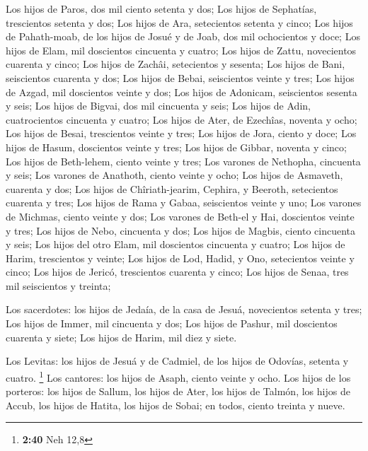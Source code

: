  Los hijos de Paros, dos mil ciento setenta y dos;
 Los hijos de Sephatías, trescientos setenta y dos;
 Los hijos de Ara, setecientos setenta y cinco;
 Los hijos de Pahath-moab, de los hijos de Josué y de
Joab, dos mil ochocientos y doce;  Los hijos de Elam, mil
doscientos cincuenta y cuatro;  Los hijos de Zattu,
novecientos cuarenta y cinco;  Los hijos de Zachâi,
setecientos y sesenta;  Los hijos de Bani, seiscientos
cuarenta y dos;  Los hijos de Bebai, seiscientos veinte y
tres;  Los hijos de Azgad, mil doscientos veinte y dos;
 Los hijos de Adonicam, seiscientos sesenta y seis;
 Los hijos de Bigvai, dos mil cincuenta y seis;
 Los hijos de Adin, cuatrocientos cincuenta y cuatro;
 Los hijos de Ater, de Ezechîas, noventa y ocho;
 Los hijos de Besai, trescientos veinte y tres;
 Los hijos de Jora, ciento y doce;  Los
hijos de Hasum, doscientos veinte y tres;  Los hijos de
Gibbar, noventa y cinco;  Los hijos de Beth-lehem, ciento
veinte y tres;  Los varones de Nethopha, cincuenta y
seis;  Los varones de Anathoth, ciento veinte y ocho;
 Los hijos de Asmaveth, cuarenta y dos; 
Los hijos de Chîriath-jearim, Cephira, y Beeroth, setecientos cuarenta y
tres;  Los hijos de Rama y Gabaa, seiscientos veinte y
uno;  Los varones de Michmas, ciento veinte y dos;
 Los varones de Beth-el y Hai, doscientos veinte y tres;
 Los hijos de Nebo, cincuenta y dos;  Los
hijos de Magbis, ciento cincuenta y seis;  Los hijos del
otro Elam, mil doscientos cincuenta y cuatro;  Los hijos
de Harim, trescientos y veinte;  Los hijos de Lod, Hadid,
y Ono, setecientos veinte y cinco;  Los hijos de Jericó,
trescientos cuarenta y cinco;  Los hijos de Senaa, tres
mil seiscientos y treinta;

 Los sacerdotes: los hijos de Jedaía, de la casa de
Jesuá, novecientos setenta y tres;  Los hijos de Immer,
mil cincuenta y dos;  Los hijos de Pashur, mil doscientos
cuarenta y siete;  Los hijos de Harim, mil diez y siete.

 Los Levitas: los hijos de Jesuá y de Cadmiel, de los
hijos de Odovías, setenta y cuatro. \footnote{\textbf{2:40} Neh 12,8}
 Los cantores: los hijos de Asaph, ciento veinte y ocho.
 Los hijos de los porteros: los hijos de Sallum, los
hijos de Ater, los hijos de Talmón, los hijos de Accub, los hijos de
Hatita, los hijos de Sobai; en todos, ciento treinta y nueve.

